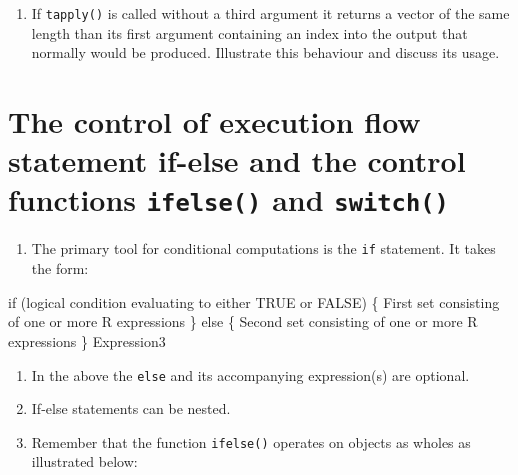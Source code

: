 \documentclass[
]{book}
\newenvironment{Shaded}{\begin{snugshade}}{\end{snugshade}}
\newcommand{\NormalTok}[1]{#1}
\providecommand{\tightlist}{%
  \setlength{\itemsep}{0pt}\setlength{\parskip}{0pt}}
\begin{document}
\begin{enumerate}
\def\labelenumi{(\alph{enumi})}
\setcounter{enumi}{4}
\tightlist
\item
  If \texttt{tapply()} is called without a third argument it returns a vector of the same length than its first argument containing an index into the output that normally would be produced. Illustrate this behaviour and discuss its usage.
\end{enumerate}

\section{\texorpdfstring{The control of execution flow statement if-else and the control functions \texttt{ifelse()} and \texttt{switch()}}{The control of execution flow statement if-else and the control functions ifelse() and switch()}}\label{the-control-of-execution-flow-statement-if-else-and-the-control-functions-ifelse-and-switch}

\begin{enumerate}
\def\labelenumi{(\alph{enumi})}
\tightlist
\item
  The primary tool for conditional computations is the \texttt{if} statement. It takes the form:
\end{enumerate}

\begin{Shaded}
\begin{Highlighting}[]
\NormalTok{if (logical condition evaluating to either TRUE or FALSE)}
\NormalTok{    \{}
\NormalTok{     First set consisting of one or more R expressions}
\NormalTok{    \}}
\NormalTok{else}
\NormalTok{    \{}
\NormalTok{     Second set consisting of one or more R expressions}
\NormalTok{    \} }
\NormalTok{Expression3}
\end{Highlighting}
\end{Shaded}

\begin{enumerate}
\def\labelenumi{(\alph{enumi})}
\setcounter{enumi}{1}
\item
  In the above the \texttt{else} and its accompanying expression(s) are optional.
\item
  If-else statements can be nested.
\item
  Remember that the function \texttt{ifelse()} operates on objects as wholes as illustrated below:
\end{enumerate}
\end{document}
